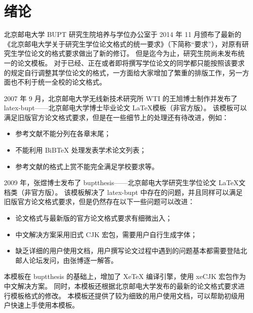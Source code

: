 
\chapter{绪论}

北京邮电大学 {BUPT} 研究生院培养与学位办公室于 2014 年 11 月颁布了最新的《北京邮电大学关于研究生学位论文格式的统一要求》（下简称“要求”）\cite{BUPT_Thesis_Format_2014}，对原有研究生学位论文的格式要求做出了新的修订。
但是迄今为止，研究生院尚未发布统一的论文模板。
对于已经、正在或者即将撰写学位论文的同学都只能按照该要求的规定自行调整其学位论文的格式，一方面给大家增加了繁重的排版工作，另一方面也不利于统一全校的论文格式。

2007 年 9 月，北京邮电大学无线新技术研究所 {WTI} 的王旭博士制作并发布了 latex-bupt——北京邮电大学博士毕业论文 \LaTeX 模板（非官方版）\cite{latex-bupt}。
该模板可以满足旧版官方论文格式要求\cite{BUPT_Thesis_Format_2004}，但是在一些细节上的处理还有待改进，例如：
\begin{itemize}
\item 参考文献不能分列在各章末尾；
\item 不能利用 BiBTeX 处理发表学术论文列表；
\item 参考文献的格式上赏不能完全满足学校要求等。
\end{itemize}

2009 年，张煜博士发布了 buptthesis——北京邮电大学研究生学位论文 \LaTeX 文档类（非官方版）\cite{buptthesis}。
该模板解决了 latex-bupt 中存在的问题，并且同样可以满足旧版官方论文格式要求\cite{BUPT_Thesis_Format_2004}，但是仍然存在以下一些问题可以改进：
\begin{itemize}
\item 论文格式与最新版的官方论文格式要求\cite{BUPT_Thesis_Format_2014}有细微出入；
\item 中文解决方案采用旧式 CJK 宏包，需要用户自行生成字体；
\item 缺乏详细的用户使用文档，用户撰写论文过程中遇到的问题基本都需要登陆北邮人论坛发问，由张博逐一解答。
\end{itemize}

本模板在 buptthesis\cite{buptthesis} 的基础上，增加了 XeTeX 编译引擎，使用 xeCJK 宏包作为中文解决方案。
同时，本模板还根据北京邮电大学发布的最新的论文格式要求\parencite{BUPT_Thesis_Format_2014}进行模板格式的修改。
本模板还提供了较为细致的用户使用文档，可以帮助初级用户快速上手使用本模板。

